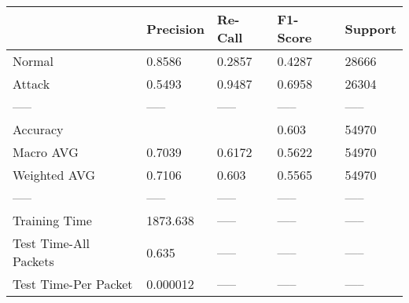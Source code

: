\begin{tabular}{lllll}
\toprule
{} & Precision & Re-Call & F1-Score & Support \\
\midrule
Normal                &    0.8586 &  0.2857 &   0.4287 &   28666 \\
Attack                &    0.5493 &  0.9487 &   0.6958 &   26304 \\
-----                 &     ----- &   ----- &    ----- &   ----- \\
Accuracy              &           &         &    0.603 &   54970 \\
Macro AVG             &    0.7039 &  0.6172 &   0.5622 &   54970 \\
Weighted AVG          &    0.7106 &   0.603 &   0.5565 &   54970 \\
-----                 &     ----- &   ----- &    ----- &   ----- \\
Training Time         &  1873.638 &   ----- &    ----- &   ----- \\
Test Time-All Packets &     0.635 &   ----- &    ----- &   ----- \\
Test Time-Per Packet  &  0.000012 &   ----- &    ----- &   ----- \\
\bottomrule
\end{tabular}
